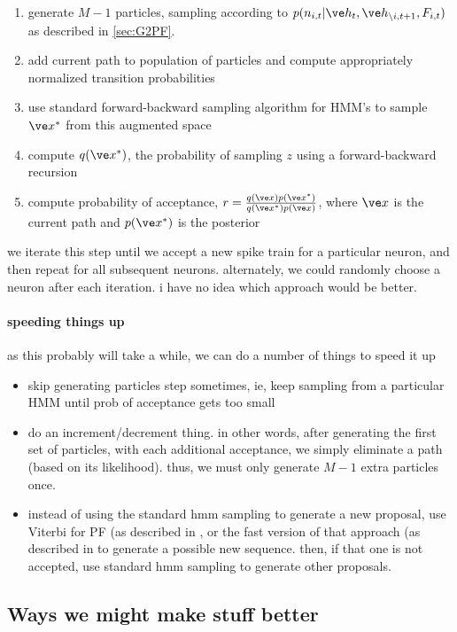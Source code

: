 \begin{enumerate}
\item generate $M-1$ particles, sampling according to $p( n_{i,t} | \h_t, \h_{\backslash i, t+1}, F_{i,t})$ as described in \ref{sec:G2PF}.  
\item add current path to population of particles and compute appropriately normalized transition probabilities
\item use standard forward-backward sampling algorithm for HMM's to sample $\x^{\ast}$ from this augmented space
\item compute $q(\x^{\ast})$, the probability of sampling $z$ using a forward-backward recursion
\item compute probability of acceptance, $r= \frac{q(\x) p(\x^{\ast})}{q(\x^{\ast})p(\x)}$, where $\x$ is the current path and $p(\x^{\ast})$ is the posterior
\end{enumerate}

we iterate this step until we accept a new spike train for a particular neuron, and then repeat for all subsequent neurons. alternately, we could randomly choose a neuron after each iteration.  i have no idea which approach would be better.

\paragraph{speeding things up}

as this probably will take a while, we can do a number of things to speed it up

\begin{itemize}
\item skip generating particles step sometimes, ie, keep sampling from a particular HMM until prob of acceptance gets too small
\item do an increment/decrement thing.  in other words, after generating the first set of particles, with each additional acceptance, we simply eliminate a path (based on its likelihood).  thus, we must only generate $M-1$ extra particles once.
\item instead of using the standard hmm sampling to generate a new proposal, use Viterbi for PF (as described in \cite{GodsillWest01}, or the fast version of that approach (as described in \cite{KlaasFreitas05} to generate a possible new sequence. then, if that one is not accepted, use standard hmm sampling to generate other proposals.
\end{itemize}

\subsection{Ways we might make stuff better}

